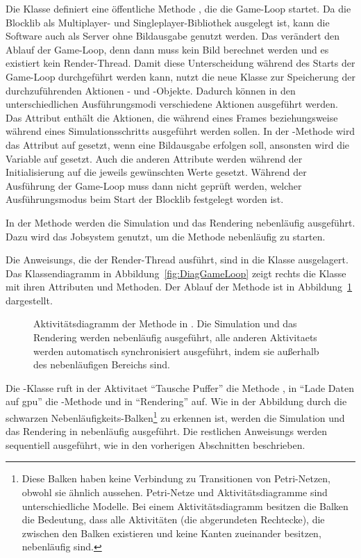 Die Klasse definiert eine öffentliche Methode , die die Game-Loop startet. Da die Blocklib als Multiplayer- und Singleplayer-Bibliothek ausgelegt ist, kann die Software auch als Server ohne Bildausgabe genutzt werden. Das verändert den Ablauf der Game-Loop, denn dann muss kein Bild berechnet werden und es existiert kein Render-Thread. Damit diese Unterscheidung während des Starts der Game-Loop durchgeführt werden kann, nutzt die neue Klasse \classGameLoop{} zur Speicherung der durchzuführenden Aktionen \classRunnable{}- und \classSupplier{}-Objekte. Dadurch können in den unterschiedlichen Ausführungsmodi verschiedene Aktionen ausgeführt werden. Das Attribut  enthält die Aktionen, die während eines Frames beziehungsweise während eines Simulationsschritts ausgeführt werden sollen. In der -Methode wird das Attribut auf  gesetzt, wenn eine Bildausgabe erfolgen soll, ansonsten wird die Variable auf  gesetzt. Auch die anderen Attribute werden während der Initialisierung auf die jeweils gewünschten Werte gesetzt. Während der Ausführung der Game-Loop muss dann nicht geprüft werden, welcher Ausführungsmodus beim Start der Blocklib festgelegt worden ist.

In der Methode  werden die Simulation und das Rendering nebenläufig ausgeführt. Dazu wird das Jobsystem genutzt, um die Methode  nebenläufig zu starten. 

Die \glspl{Anweisung}, die der Render-Thread ausführt, sind in die Klasse \classRenderThread{} ausgelagert. Das Klassendiagramm in Abbildung~\ref{fig:DiagGameLoop} zeigt rechts die Klasse \classRenderThread{} mit ihren Attributen und Methoden. Der Ablauf der Methode  ist in Abbildung~\ref{fig:stepWindowActivity} dargestellt.
\begin{figure}
	\centering
	
	\caption[Aktivitätsdiagramm der Methode  in \classGameLoop{}.]{Aktivitätsdiagramm der Methode  in \classGameLoop{}. Die Simulation und das Rendering werden nebenläufig ausgeführt, alle anderen \glspl{Aktivitaet} werden automatisch synchronisiert ausgeführt, indem sie außerhalb des nebenläufigen Bereichs sind.}\label{fig:stepWindowActivity}
\end{figure}
Die \classGameLoop{}-Klasse ruft in der \gls{Aktivitaet} \enquote{Tausche Puffer} die Methode , in \enquote{Lade Daten auf \ac{gpu}} die -Methode und in \enquote{Rendering}  auf. Wie in der Abbildung durch die schwarzen Nebenläufigkeits-Balken\footnote{Diese Balken haben keine Verbindung zu Transitionen von Petri-Netzen, obwohl sie ähnlich aussehen. Petri-Netze und Aktivitätsdiagramme sind unterschiedliche Modelle. Bei einem Aktivitätsdiagramm besitzen die Balken die Bedeutung, dass alle Aktivitäten (die abgerundeten Rechtecke), die zwischen den Balken existieren und keine Kanten zueinander besitzen, nebenläufig sind.} zu erkennen ist, werden die Simulation und das Rendering in  nebenläufig ausgeführt. Die restlichen \glspl{Anweisung} werden sequentiell ausgeführt, wie in den vorherigen Abschnitten beschrieben.